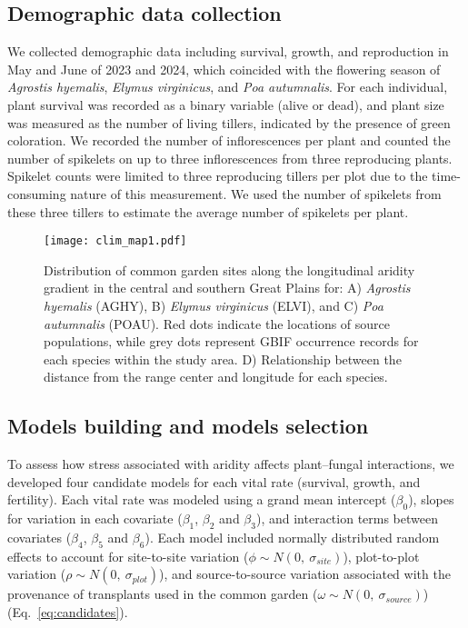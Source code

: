 \documentclass[12pt]{article}\usepackage[]{graphicx}\usepackage[dvipsnames]{xcolor}
\begin{document}
\subsection*{Demographic data collection}
We collected demographic data including survival, growth, and reproduction in May and June of 2023 and 2024, which coincided with the flowering season of \emph{Agrostis hyemalis}, \emph{Elymus virginicus}, and \emph{Poa autumnalis}. 
For each individual, plant survival was recorded as a binary variable (alive or dead), and plant size was measured as the number of living tillers, indicated by the presence of green coloration.  
We recorded the number of inflorescences per plant and counted the number of spikelets on up to three inflorescences from three reproducing plants.  
Spikelet counts were limited to three reproducing tillers per plot due to the time-consuming nature of this measurement.  
We used the number of spikelets from these three tillers to estimate the average number of spikelets per plant.

\begin{figure}[H]
\centering
\texttt{[image: clim\_map1.pdf]}
\caption{Distribution of common garden sites along the longitudinal aridity gradient in the central and southern Great Plains for: A) \emph{Agrostis hyemalis} (AGHY), B)  \emph{Elymus virginicus} (ELVI), and C)  \emph{Poa autumnalis} (POAU). Red dots indicate the locations of source populations, while grey dots represent GBIF occurrence records for each species within the study area. D) Relationship between the distance from the range center and longitude for each species.}
\label{fig:site}
\end{figure}


\subsection*{Models building and models selection}
To assess how stress associated with aridity affects plant–fungal  interactions, we developed four candidate models for each vital rate (survival, growth, and fertility).  
Each vital rate was modeled using a grand mean intercept ($\beta_{0}$), slopes for variation in each covariate ($\beta_{1}$, $\beta_{2}$ and $\beta_{3}$), and interaction terms between covariates ($\beta_{4}$, $\beta_{5}$ and $\beta_{6}$).  
Each model included normally distributed random effects to account for site-to-site variation ($\phi \sim N(0,\ \sigma_{site})$), plot-to-plot variation ($\rho \sim N(0,\ \sigma_{plot})$), and source-to-source variation associated with the provenance of transplants used in the common garden ($\omega \sim N(0,\ \sigma_{source})$) (Eq.~\ref{eq:candidates}).
\end{document}
